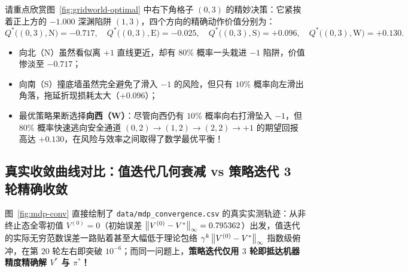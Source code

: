 请重点欣赏图~\ref{fig:gridworld-optimal} 中右下角格子 $(0, 3)$ 的精妙决策：它紧挨着正上方的 $-1.000$ 深渊陷阱 $(1, 3)$，四个方向的精确动作价值分别为：
\[
  Q^*\big((0,3), \text{N}\big) = -0.717,\quad
  Q^*\big((0,3), \text{E}\big) = -0.025,\quad
  Q^*\big((0,3), \text{S}\big) = +0.096,\quad
  Q^*\big((0,3), \text{W}\big) = \mathbf{+0.130}.
\]
\begin{itemize}
  \item 向北（N）虽然看似离 $+1$ 直线更近，却有 $80\%$ 概率一头栽进 $-1$ 陷阱，价值惨淡至 $-0.717$；
  \item 向南（S）撞底墙虽然完全避免了滑入 $-1$ 的风险，但只有 $10\%$ 概率向左滑出角落，拖延折现损耗太大（$+0.096$）；
  \item 最优策略果断选择\textbf{向西（W）}：尽管向西仍有 $10\%$ 概率向右打滑坠入 $-1$，但 $80\%$ 概率快速逃向安全通道 $(0,2)\to(1,2)\to(2,2)\to +1$ 的期望回报高达 $+0.130$，在风险与效率之间取得了数学最优平衡！
\end{itemize}

\subsection{真实收敛曲线对比：值迭代几何衰减 vs 策略迭代 3 轮精确收敛}

图~\ref{fig:mdp-conv} 直接绘制了 \texttt{data/mdp\_convergence.csv} 的真实实测轨迹：从非终止态全零初值 $V^{(0)} = 0$（初始误差 $\left\|V^{(0)} - V^*\right\|_\infty = 0.795362$）出发，值迭代的实际无穷范数误差一路贴着甚至大幅低于理论包络 $\gamma^k \left\|V^{(0)} - V^*\right\|_\infty$ 指数级俯冲，在第 $20$ 轮左右即突破 $10^{-6}$；而同一问题上，\textbf{策略迭代仅用 $3$ 轮即抵达机器精度精确解 $V^*$ 与 $\pi^*$！}

